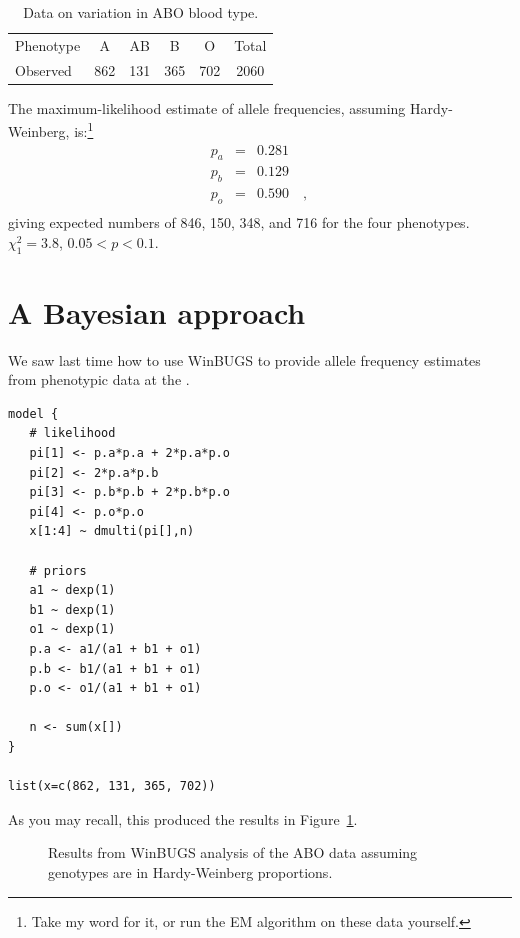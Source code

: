\begin{table}
\begin{center}
\begin{tabular}{lccccc}
Phenotype &   A &  AB &   B &   O & Total \\
Observed  & 862 & 131 & 365 & 702 & 2060
\end{tabular}
\end{center}
\caption{Data on variation in ABO blood type.}\label{table:abo-data}
\end{table}
The maximum-likelihood estimate of allele frequencies,
assuming Hardy-Weinberg, is:\footnote{Take my word for it, or run the
  EM algorithm on these data yourself.}
\begin{eqnarray*}
p_a &=& 0.281 \\
p_b &=& 0.129 \\
p_o &=& 0.590 \quad , \\
\end{eqnarray*}
giving expected numbers of 846, 150, 348, and 716 for the
four phenotypes. $\chi^2_1 = 3.8$, $0.05 < p < 0.1$.

\section*{A Bayesian approach}

We saw last time how to use WinBUGS to provide allele frequency
estimates from phenotypic data at the .
\begin{verbatim}
model {
   # likelihood 
   pi[1] <- p.a*p.a + 2*p.a*p.o
   pi[2] <- 2*p.a*p.b
   pi[3] <- p.b*p.b + 2*p.b*p.o
   pi[4] <- p.o*p.o
   x[1:4] ~ dmulti(pi[],n)

   # priors
   a1 ~ dexp(1)
   b1 ~ dexp(1)
   o1 ~ dexp(1)
   p.a <- a1/(a1 + b1 + o1)
   p.b <- b1/(a1 + b1 + o1)
   p.o <- o1/(a1 + b1 + o1)

   n <- sum(x[])
}

list(x=c(862, 131, 365, 702))
\end{verbatim}
As you may recall, this produced the results in
Figure~\ref{fig:multinomial-results}.

\begin{figure}
\caption{Results from WinBUGS analysis of the ABO
  data assuming genotypes are in Hardy-Weinberg proportions.}\label{fig:multinomial-results}
\end{figure}

